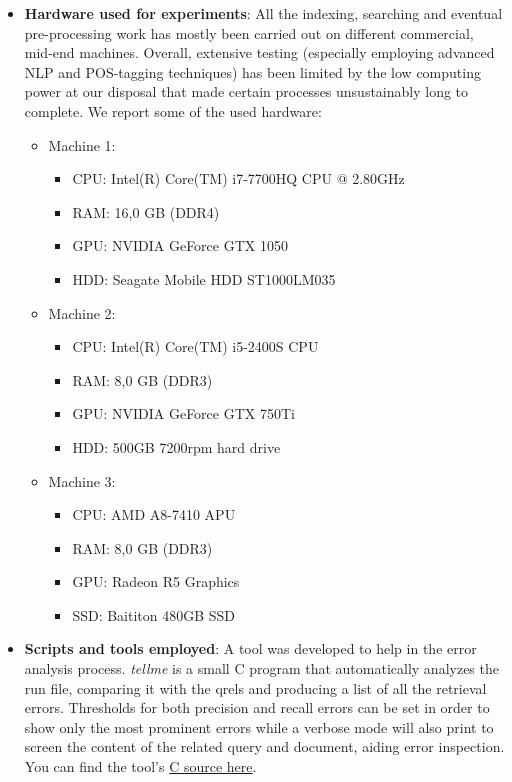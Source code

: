 \begin{itemize}
            
	\item \textbf{Hardware used for experiments}: All the indexing, searching and eventual pre-processing work has mostly been carried out on different commercial, mid-end machines. Overall, extensive testing (especially employing advanced NLP and POS-tagging techniques) has been limited by the low computing power at our disposal that made certain processes unsustainably long to complete. We report some of the used hardware:
     \begin{itemize}
         \item Machine 1:
            \begin{itemize}
                \item CPU: Intel(R) Core(TM) i7-7700HQ CPU @ 2.80GHz
                \item RAM: 16,0 GB (DDR4)
                \item GPU: NVIDIA GeForce GTX 1050
                \item HDD: Seagate Mobile HDD ST1000LM035
            \end{itemize}
        \item Machine 2:
            \begin{itemize}
                \item CPU: Intel(R) Core(TM) i5-2400S CPU
                \item RAM: 8,0 GB (DDR3)
                \item GPU: NVIDIA GeForce GTX 750Ti
                \item HDD: 500GB 7200rpm hard drive
            \end{itemize}
        \item Machine 3:
            \begin{itemize}
                \item CPU: AMD A8-7410 APU
                \item RAM: 8,0 GB (DDR3)
                \item GPU: Radeon R5 Graphics
                \item SSD: Baititon 480GB SSD 
            \end{itemize}
            
     \end{itemize}
     
	\item \textbf{Scripts and tools employed}: A tool was developed to help in the error analysis process. \emph{tellme} is a small C program that automatically analyzes the run file, comparing it with the qrels and producing a list of all the retrieval errors. Thresholds for both precision and recall errors can be set in order to show only the most prominent errors while a verbose mode will also print to screen the content of the related query and document, aiding error inspection. You can find the tool's \href{https://bitbucket.org/upd-dei-stud-prj/seupd2223-dards/src/master/tellmev3.c}{C source here}.
\end{itemize}